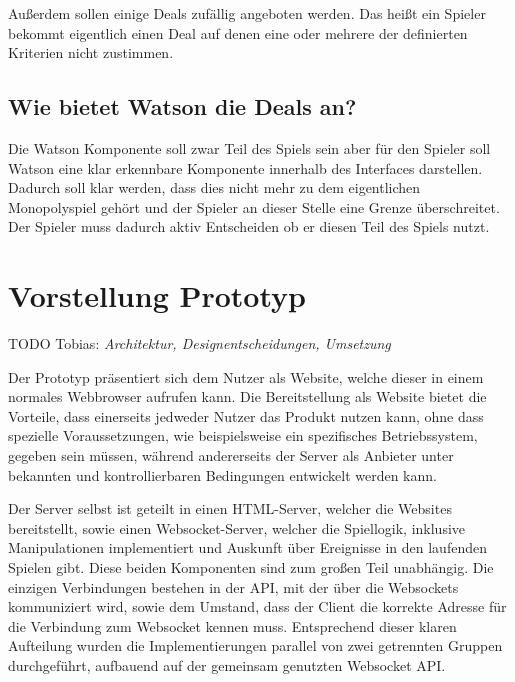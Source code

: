 \documentclass[german]{cgspaper} %
\newcommand{\todo}[1]{\textit{#1}}
\newcommand{\Tobias}[1]{\textcolor{colorTobias}{TODO Tobias:} \todo{#1} }
\begin{document}
Außerdem sollen einige Deals zufällig angeboten werden.
Das heißt ein Spieler bekommt eigentlich einen Deal auf denen eine oder mehrere der definierten Kriterien nicht zustimmen.

\subsection{Wie bietet Watson die Deals an?}

Die Watson Komponente soll zwar Teil des Spiels sein aber für den Spieler soll Watson eine klar erkennbare Komponente innerhalb des Interfaces darstellen.
Dadurch soll klar werden, dass dies nicht mehr zu dem eigentlichen Monopolyspiel gehört und der Spieler an dieser Stelle eine Grenze überschreitet.
Der Spieler muss dadurch aktiv Entscheiden ob er diesen Teil des Spiels nutzt.

\section{Vorstellung Prototyp}

\Tobias{Architektur, Designentscheidungen, Umsetzung}

Der Prototyp präsentiert sich dem Nutzer als Website, welche dieser in einem normales Webbrowser aufrufen kann.
Die Bereitstellung als Website bietet die Vorteile, dass einerseits jedweder Nutzer das Produkt nutzen kann, ohne dass spezielle Voraussetzungen, wie beispielsweise ein spezifisches Betriebssystem, gegeben sein müssen, während andererseits der Server als Anbieter unter bekannten und kontrollierbaren Bedingungen entwickelt werden kann.

Der Server selbst ist geteilt in einen HTML-Server, welcher die Websites bereitstellt, sowie einen Websocket-Server, welcher die Spiellogik, inklusive Manipulationen implementiert und Auskunft über Ereignisse in den laufenden Spielen gibt.
Diese beiden Komponenten sind zum großen Teil unabhängig. Die einzigen Verbindungen bestehen in der API, mit der über die Websockets kommuniziert wird, sowie dem Umstand, dass der Client die korrekte Adresse für die Verbindung zum Websocket kennen muss.
Entsprechend dieser klaren Aufteilung wurden die Implementierungen parallel von zwei getrennten Gruppen durchgeführt, aufbauend auf der gemeinsam genutzten Websocket API.
\end{document}
